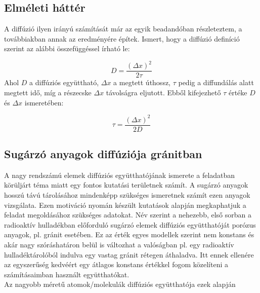 \section{} \label{sec:1}

\subsection{Elméleti háttér}
A diffúzió ilyen irányú számítását már az egyik beadandóban részleteztem, a továbbiakban annak az eredményére építek. Ismert, hogy a diffúzió definíció szerint az alábbi összefüggéssel írható le:

\begin{equation} \label{eq:1}
    D
    =
    \frac{\left( \Delta x \right)^{2}}{2 \tau}
\end{equation}
Ahol $D$ a diffúziós együttható, $\Delta x$ a megtett úthossz, $\tau$ pedig a diffundálás alatt megtett idő, míg a részecske $\Delta x$ távolságra eljutott. Ebből kifejezhető $\tau$ értéke $D$ és $\Delta x$ ismeretében:

\begin{equation} \label{eq:2}
    \tau
    =
    \frac{\left( \Delta x \right)^{2}}{2D}
\end{equation}

\subsection{Sugárzó anyagok diffúziója gránitban}
A nagy rendszámú elemek diffúziós együtthatójának ismerete a feladatban körüljárt téma miatt egy fontos kutatási területnek számít. A sugárzó anyagok hosszú távú tárolásához mindenképp szükséges ismeretnek számít ezen anyagok vizsgálata. Ezen motiváció nyomán készült kutatások alapján megkaphatjuk a feladat megoldásához szükséges adatokat. Név szerint a nehezebb, első sorban a radioaktív hulladékban előforduló sugárzó elemek diffúziós együtthatóját porózus anyagok, pl. gránit esetében. Ez az érték egyes modellek szerint nem konstans és akár nagy szóráshatáron belül is változhat a valóságban pl. egy radioaktív hulladéktárolóból indulva egy vastag gránit rétegen áthaladva\cite{medvevd2018varying}. Itt ennek ellenére az egyszerűség kedvéért egy átlagos konstans értékkel fogom közelíteni a számításaimban használt együtthatókat. \\
Az nagyobb méretű atomok/molekulák diffúziós együtthatója ezek alapján

